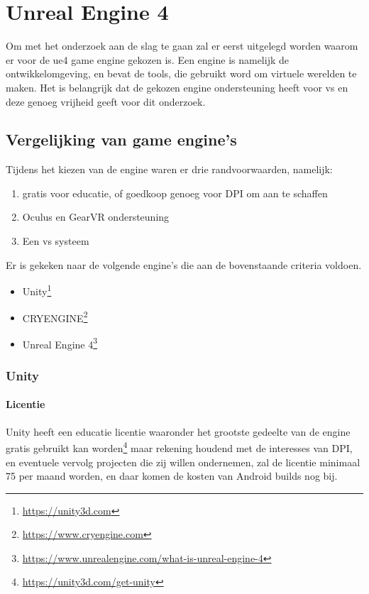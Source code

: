 \chapter{Unreal Engine 4}

Om met het onderzoek aan de slag te gaan zal er eerst uitgelegd worden waarom er voor de \gls{ue4} game engine gekozen is. Een engine is namelijk de ontwikkelomgeving, en bevat de tools, die gebruikt word om virtuele werelden te maken. Het is belangrijk dat de gekozen engine ondersteuning heeft voor \gls{vs} en deze genoeg vrijheid geeft voor dit onderzoek.


\section{Vergelijking van game engine's}

Tijdens het kiezen van de engine waren er drie randvoorwaarden, namelijk: 
\begin{enumerate}
	\item gratis voor educatie, of goedkoop genoeg voor DPI om aan te schaffen
	\item Oculus en GearVR ondersteuning
	\item Een \gls{vs} systeem
\end{enumerate}

Er is gekeken naar de volgende engine's die aan de bovenstaande criteria voldoen.
\begin{itemize}
\item Unity\footnote{\url{https://unity3d.com}}
\item CRYENGINE\footnote{\url{https://www.cryengine.com}}
\item Unreal Engine 4\footnote{\url{https://www.unrealengine.com/what-is-unreal-engine-4}}
\end{itemize}

\subsection{Unity}

\subsubsection{Licentie}
Unity heeft een educatie licentie waaronder het grootste gedeelte van de engine gratis gebruikt kan worden\footnote{\url{https://unity3d.com/get-unity}} maar rekening houdend met de interesses van DPI, en eventuele vervolg projecten die zij willen ondernemen, zal de licentie minimaal 75 per maand worden, en daar komen de kosten van Android builds nog bij.

